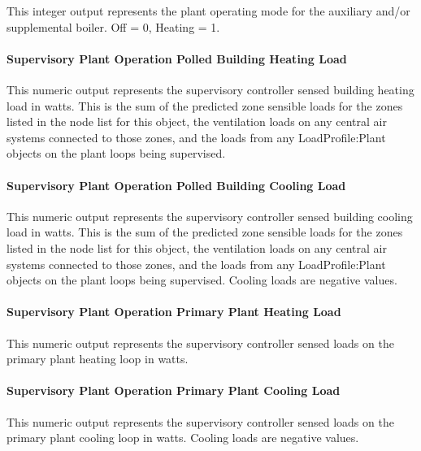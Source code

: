 This integer output represents the plant operating mode for the auxiliary and/or supplemental boiler. Off = 0, Heating = 1.

\paragraph{Supervisory Plant Operation Polled Building Heating Load}\label{operation-scheme-outputs-supervisory-plant-operation-sensed-heating-load}

This numeric output represents the supervisory controller sensed building heating load in watts.  This is the sum of the predicted zone sensible loads for the zones listed in the node list for this object, the ventilation loads on any central air systems connected to those zones, and the loads from any LoadProfile:Plant objects on the plant loops being supervised. 

\paragraph{Supervisory Plant Operation Polled Building Cooling Load}\label{operation-scheme-outputs-supervisory-plant-operation-sensed-cooling-load}

This numeric output represents the supervisory controller sensed building cooling load in watts.  This is the sum of the predicted zone sensible loads for the zones listed in the node list for this object, the ventilation loads on any central air systems connected to those zones, and the loads from any LoadProfile:Plant objects on the plant loops being supervised. Cooling loads are negative values.

\paragraph{Supervisory Plant Operation Primary Plant Heating Load}\label{operation-scheme-outputs-supervisory-plant-heating-loads}

This numeric output represents the supervisory controller sensed loads on the primary plant heating loop in watts.

\paragraph{Supervisory Plant Operation Primary Plant Cooling Load}\label{operation-scheme-outputs-supervisory-plant-cooling-loads}

This numeric output represents the supervisory controller sensed loads on the primary plant cooling loop in watts.  Cooling loads are negative values.

